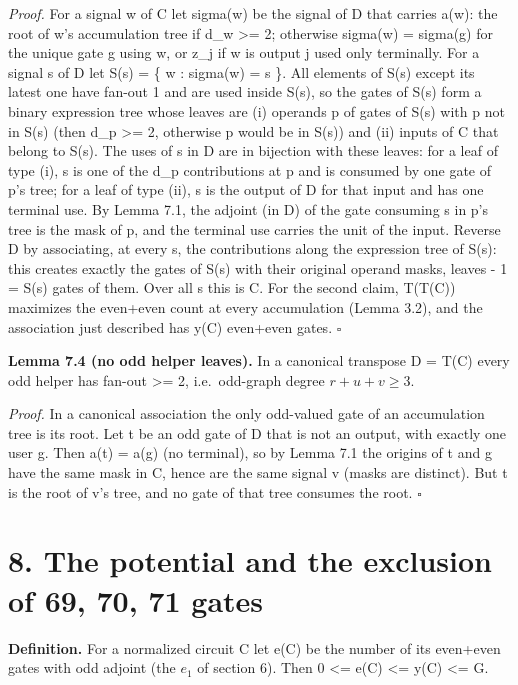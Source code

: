 \emph{Proof.} For a signal w of C let sigma(w) be the signal of D that carries a(w): the root of w's accumulation tree if d\_w \textgreater= 2; otherwise sigma(w) = sigma(g) for the unique gate g using w, or z\_j if w is output j used only terminally. For a signal s of D let S(s) = \{ w : sigma(w) = s \}. All elements of S(s) except its latest one have fan-out 1 and are used inside S(s), so the gates of S(s) form a binary expression tree whose leaves are (i) operands p of gates of S(s) with p not in S(s) (then d\_p \textgreater= 2, otherwise p would be in S(s)) and (ii) inputs of C that belong to S(s). The uses of s in D are in bijection with these leaves: for a leaf of type (i), s is one of the d\_p contributions at p and is consumed by one gate of p's tree; for a leaf of type (ii), s is the output of D for that input and has one terminal use. By Lemma 7.1, the adjoint (in D) of the gate consuming s in p's tree is the mask of p, and the terminal use carries the unit of the input. Reverse D by associating, at every s, the contributions along the expression tree of S(s): this creates exactly the gates of S(s) with their original operand masks, \textbar leaves\textbar{} - 1 = \textbar S(s) gates\textbar{} of them. Over all s this is C. For the second claim, T(T(C)) maximizes the even+even count at every accumulation (Lemma 3.2), and the association just described has y(C) even+even gates. \(\square\)

\textbf{Lemma 7.4 (no odd helper leaves).} In a canonical transpose D = T(C) every odd helper has fan-out \textgreater= 2, i.e.~odd-graph degree \(r+u+v\ge3\).

\emph{Proof.} In a canonical association the only odd-valued gate of an accumulation tree is its root. Let t be an odd gate of D that is not an output, with exactly one user g. Then a(t) = a(g) (no terminal), so by Lemma 7.1 the origins of t and g have the same mask in C, hence are the same signal v (masks are distinct). But t is the root of v's tree, and no gate of that tree consumes the root. \(\square\)

\hypertarget{the-potential-and-the-exclusion-of-69-70-71-gates}{%
\section{8. The potential and the exclusion of 69, 70, 71 gates}\label{the-potential-and-the-exclusion-of-69-70-71-gates}}

\textbf{Definition.} For a normalized circuit C let e(C) be the number of its even+even gates with odd adjoint (the \(e_1\) of section 6). Then 0 \textless= e(C) \textless= y(C) \textless= G.

